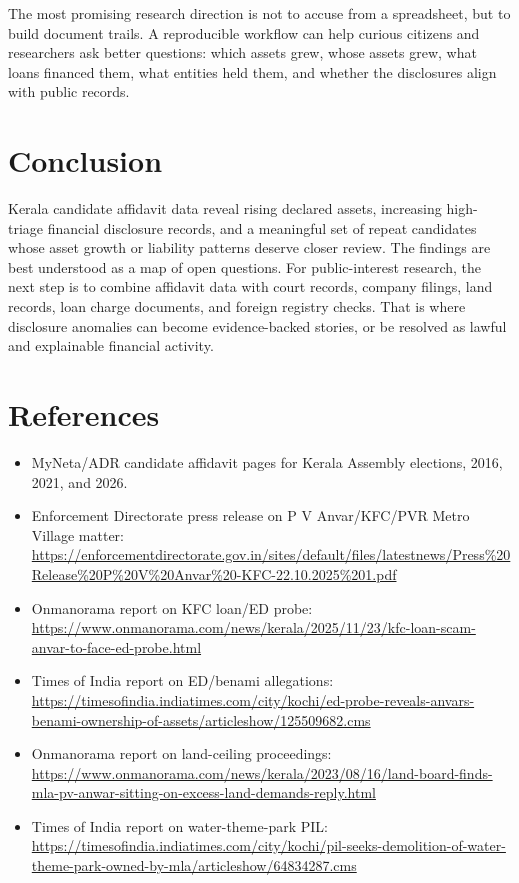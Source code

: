\documentclass[11pt]{article}
\begin{document}
The most promising research direction is not to accuse from a spreadsheet, but to build document trails. A reproducible workflow can help curious citizens and researchers ask better questions: which assets grew, whose assets grew, what loans financed them, what entities held them, and whether the disclosures align with public records.

\section{Conclusion}

Kerala candidate affidavit data reveal rising declared assets, increasing high-triage financial disclosure records, and a meaningful set of repeat candidates whose asset growth or liability patterns deserve closer review. The findings are best understood as a map of open questions. For public-interest research, the next step is to combine affidavit data with court records, company filings, land records, loan charge documents, and foreign registry checks. That is where disclosure anomalies can become evidence-backed stories, or be resolved as lawful and explainable financial activity.

\section*{References}

\begin{itemize}
  \item MyNeta/ADR candidate affidavit pages for Kerala Assembly elections, 2016, 2021, and 2026.
  \item Enforcement Directorate press release on P V Anvar/KFC/PVR Metro Village matter: \url{https://enforcementdirectorate.gov.in/sites/default/files/latestnews/Press%20Release%20P%20V%20Anvar%20-KFC-22.10.2025%201.pdf}
  \item Onmanorama report on KFC loan/ED probe: \url{https://www.onmanorama.com/news/kerala/2025/11/23/kfc-loan-scam-anvar-to-face-ed-probe.html}
  \item Times of India report on ED/benami allegations: \url{https://timesofindia.indiatimes.com/city/kochi/ed-probe-reveals-anvars-benami-ownership-of-assets/articleshow/125509682.cms}
  \item Onmanorama report on land-ceiling proceedings: \url{https://www.onmanorama.com/news/kerala/2023/08/16/land-board-finds-mla-pv-anwar-sitting-on-excess-land-demands-reply.html}
  \item Times of India report on water-theme-park PIL: \url{https://timesofindia.indiatimes.com/city/kochi/pil-seeks-demolition-of-water-theme-park-owned-by-mla/articleshow/64834287.cms}
\end{itemize}
\end{document}
